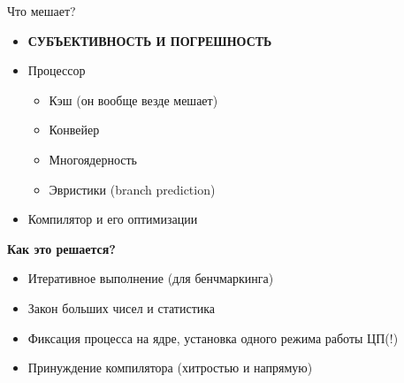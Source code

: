 \begin{frame}{Что мешает?}
	\begin{itemize}
		\item \textbf{СУБЪЕКТИВНОСТЬ И ПОГРЕШНОСТЬ}
		\item Процессор
		\begin{itemize}
			\item Кэш (он вообще везде мешает)
			\item Конвейер
			\item Многоядерность
			\item Эвристики (branch prediction)
		\end{itemize}
		\item Компилятор и его оптимизации
	\end{itemize}
	\begin{center}
		\textbf{Как это решается?}
	\end{center}
	\begin{itemize}
		\item Итеративное выполнение (для бенчмаркинга)
		\item Закон больших чисел и статистика
		\item Фиксация процесса на ядре, установка одного режима работы ЦП(!)
		\item Принуждение компилятора (хитростью и напрямую)
	\end{itemize}
\end{frame}